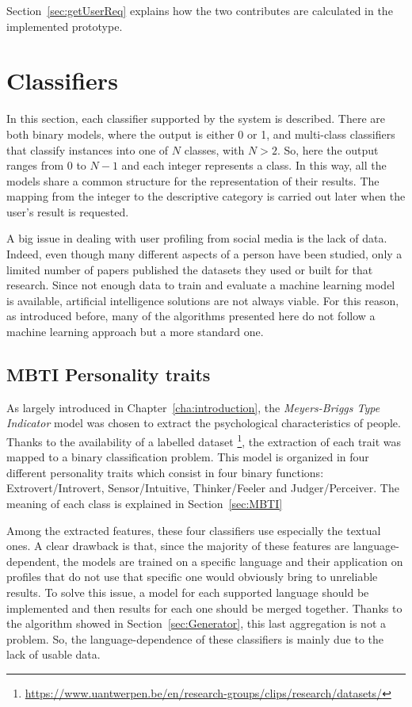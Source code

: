 Section~\ref{sec:getUserReq} explains how the two contributes are calculated in the implemented prototype.

\section{Classifiers}

\label{sec:Classifiers}

In this section, each classifier supported by the system is described. There are both binary models, where the output is either 0 or 1, and multi-class classifiers that classify instances into one of $N$ classes, with $N>2$. So, here the output ranges from 0 to $N-1$ and each integer represents a class.
In this way, all the models share a common structure for the representation of their results. The mapping from the integer to the descriptive category is carried out later when the user's result is requested.

A big issue in dealing with user profiling from social media is the lack of data. Indeed, even though many different aspects of a person have been studied, only a limited number of papers published the datasets they used or built for that research.
Since not enough data to train and evaluate a machine learning model is available, artificial intelligence solutions are not always viable.
For this reason, as introduced before, many of the algorithms presented here do not follow a machine learning approach but a more standard one.

\subsection{MBTI Personality traits}
As largely introduced in Chapter~\ref{cha:introduction}, the \textit{Meyers-Briggs Type Indicator} model was chosen to extract the psychological characteristics of people.
Thanks to the availability of a labelled dataset \footnote{\url{https://www.uantwerpen.be/en/research-groups/clips/research/datasets/}}, the extraction of each trait was mapped to a binary classification problem.
This model is organized in four different personality traits which consist in four binary functions: Extrovert/Introvert, Sensor/Intuitive, Thinker/Feeler and Judger/Perceiver. The meaning of each class is explained in Section~\ref{sec:MBTI}

Among the extracted features, these four classifiers use especially the textual ones.
A clear drawback is that, since the majority of these features are language-dependent, the models are trained on a specific language and their application on profiles that do not use that specific one would obviously bring to unreliable results.
To solve this issue, a model for each supported language should be implemented and then results for each one should be merged together. Thanks to the algorithm showed in Section~\ref{sec:Generator}, this last aggregation is not a problem.
So, the language-dependence of these classifiers is mainly due to the lack of usable data.

